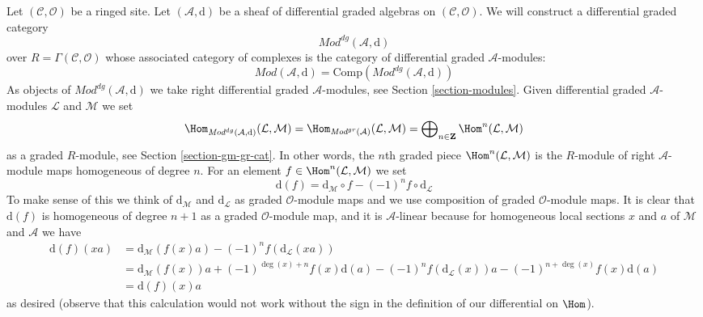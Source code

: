 \medskip\noindent
Let $(\mathcal{C}, \mathcal{O})$ be a ringed site.
Let $(\mathcal{A}, \text{d})$ be a sheaf of differential graded algebras
on $(\mathcal{C}, \mathcal{O})$. We will construct
a differential graded category
$$
\textit{Mod}^{dg}(\mathcal{A}, \text{d})
$$
over $R = \Gamma(\mathcal{C}, \mathcal{O})$ whose associated category
of complexes is the category of differential graded $\mathcal{A}$-modules:
$$
\textit{Mod}(\mathcal{A}, \text{d}) =
\text{Comp}(\textit{Mod}^{dg}(\mathcal{A}, \text{d}))
$$
As objects of $\textit{Mod}^{dg}(\mathcal{A}, \text{d})$ we take right
differential graded $\mathcal{A}$-modules, see
Section \ref{section-modules}. Given differential graded
$\mathcal{A}$-modules $\mathcal{L}$ and $\mathcal{M}$ we set
$$
\Hom_{\textit{Mod}^{dg}(\mathcal{A}, \text{d})}(\mathcal{L}, \mathcal{M}) =
\Hom_{\textit{Mod}^{gr}(\mathcal{A})}(\mathcal{L}, \mathcal{M}) =
\bigoplus\nolimits_{n \in \mathbf{Z}} \Hom^n(\mathcal{L}, \mathcal{M})
$$
as a graded $R$-module, see Section \ref{section-gm-gr-cat}.
In other words, the $n$th graded piece
$\Hom^n(\mathcal{L}, \mathcal{M})$ is the $R$-module of right
$\mathcal{A}$-module maps homogeneous of degree $n$.
For an element $f \in \Hom^n(\mathcal{L}, \mathcal{M})$ we set
$$
\text{d}(f) =
\text{d}_\mathcal{M} \circ f - (-1)^n f \circ \text{d}_\mathcal{L}
$$
To make sense of this we think of $\text{d}_\mathcal{M}$ and
$\text{d}_\mathcal{L}$ as graded $\mathcal{O}$-module maps and
we use composition of graded $\mathcal{O}$-module maps.
It is clear that $\text{d}(f)$ is homogeneous of
degree $n + 1$ as a graded $\mathcal{O}$-module map, and it is
$\mathcal{A}$-linear because for homogeneous local sections $x$ and $a$
of $\mathcal{M}$ and $\mathcal{A}$ we have
\begin{align*}
\text{d}(f)(xa)
& =
\text{d}_\mathcal{M}(f(x) a) - (-1)^n f (\text{d}_\mathcal{L}(xa)) \\
& =
\text{d}_\mathcal{M}(f(x)) a + (-1)^{\deg(x) + n} f(x) \text{d}(a) 
- (-1)^n f(\text{d}_\mathcal{L}(x)) a - (-1)^{n + \deg(x)} f(x) \text{d}(a) \\
& = \text{d}(f)(x) a
\end{align*}
as desired (observe that this calculation would not work without the
sign in the definition of our differential on $\Hom$).

